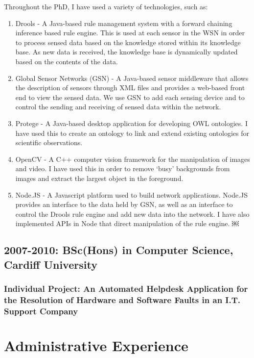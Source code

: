 \documentclass[11pt,fullpage]{article}
\begin{document}
Throughout the PhD, I have used a variety of technologies, such as:
\begin{enumerate}
	\item Drools - A Java-based rule management system with a forward chaining inference based rule engine. This is used at each sensor in the WSN in order to process sensed data based on the knowledge stored within its knowledge base. As new data is received, the knowledge base is dynamically updated based on the contents of the data.
	\item Global Sensor Networks (GSN) - A Java-based sensor middleware that allows the description of sensors through XML files and provides a web-based front end to view the sensed data. We use GSN to add each sensing device and to control the sending and receiving of sensed data within the network.
	\item Protege - A Java-based desktop application for developing OWL ontologies. I have used this to create an ontology to link and extend existing ontologies for scientific observations.
	\item OpenCV - A C++ computer vision framework for the manipulation of images and video. I have used this in order to remove `busy' backgrounds from images and extract the largest object in the foreground.
	\item Node.JS - A Javascript platform used to build network applications. Node.JS provides an interface to the data held by GSN, as well as an interface to control the Drools rule engine and add new data into the network. I have also implemented APIs in Node that direct manipulation of the rule engine.
￼\end{enumerate}
	
\subsection*{\textbf{2007-2010: BSc(Hons)} in Computer Science, Cardiff University}
\subsubsection*{\textbf{Individual Project:} An Automated Helpdesk Application for the Resolution of Hardware and Software Faults in an I.T. Support Company}

\section*{Administrative Experience}
\end{document}
